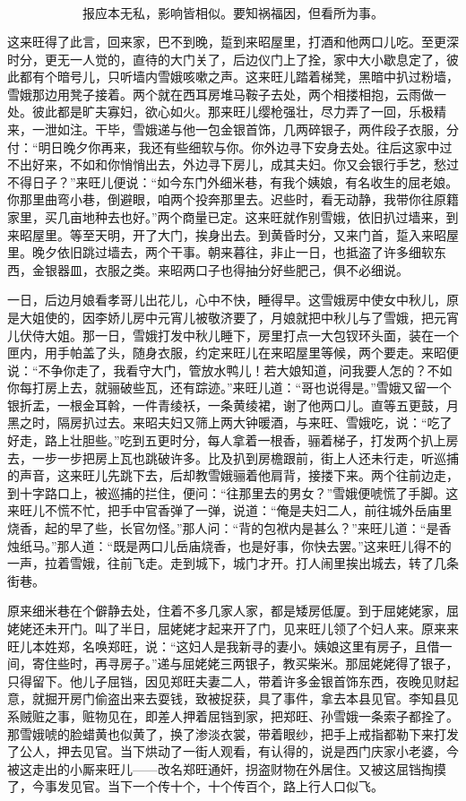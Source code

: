 \[
报应本无私，影响皆相似。
要知祸福因，但看所为事。
\]

这来旺得了此言，回来家，巴不到晚，踅到来昭屋里，打酒和他两口儿吃。至更深时分，更无一人觉的，直待的大门关了，后边仪门上了拴，家中大小歇息定了，彼此都有个暗号儿，只听墙内雪娥咳嗽之声。这来旺儿踏着梯凳，黑暗中扒过粉墙，雪娥那边用凳子接着。两个就在西耳房堆马鞍子去处，两个相搂相抱，云雨做一处。彼此都是旷夫寡妇，欲心如火。那来旺儿缨枪强壮，尽力弄了一回，乐极精来，一泄如注。干毕，雪娥递与他一包金银首饰，几两碎银子，两件段子衣服，分付：“明日晚夕你再来，我还有些细软与你。你外边寻下安身去处。往后这家中过不出好来，不如和你悄悄出去，外边寻下房儿，成其夫妇。你又会银行手艺，愁过不得日子？”来旺儿便说：“如今东门外细米巷，有我个姨娘，有名收生的屈老娘。你那里曲弯小巷，倒避眼，咱两个投奔那里去。迟些时，看无动静，我带你往原籍家里，买几亩地种去也好。”两个商量已定。这来旺就作别雪娥，依旧扒过墙来，到来昭屋里。等至天明，开了大门，挨身出去。到黄昏时分，又来门首，踅入来昭屋里。晚夕依旧跳过墙去，两个干事。朝来暮往，非止一日，也抵盗了许多细软东西，金银器皿，衣服之类。来昭两口子也得抽分好些肥己，俱不必细说。

一日，后边月娘看孝哥儿出花儿，心中不快，睡得早。这雪娥房中使女中秋儿，原是大姐使的，因李娇儿房中元宵儿被敬济要了，月娘就把中秋儿与了雪娥，把元宵儿伏侍大姐。那一日，雪娥打发中秋儿睡下，房里打点一大包钗环头面，装在一个匣内，用手帕盖了头，随身衣服，约定来旺儿在来昭屋里等候，两个要走。来昭便说：“不争你走了，我看守大门，管放水鸭儿！若大娘知道，问我要人怎的？不如你每打房上去，就骊破些瓦，还有踪迹。”来旺儿道：“哥也说得是。”雪娥又留一个银折盂，一根金耳斡，一件青绫袄，一条黄绫裙，谢了他两口儿。直等五更鼓，月黑之时，隔房扒过去。来昭夫妇又筛上两大钟暖酒，与来旺、雪娥吃，说：“吃了好走，路上壮胆些。”吃到五更时分，每人拿着一根香，骊着梯子，打发两个扒上房去，一步一步把房上瓦也跳破许多。比及扒到房檐跟前，街上人还未行走，听巡捕的声音，这来旺儿先跳下去，后却教雪娥骊着他肩背，接搂下来。两个往前边走，到十字路口上，被巡捕的拦住，便问：“往那里去的男女？”雪娥便唬慌了手脚。这来旺儿不慌不忙，把手中官香弹了一弹，说道：“俺是夫妇二人，前往城外岳庙里烧香，起的早了些，长官勿怪。”那人问：“背的包袱内是甚么？”来旺儿道：“是香烛纸马。”那人道：“既是两口儿岳庙烧香，也是好事，你快去罢。”这来旺儿得不的一声，拉着雪娥，往前飞走。走到城下，城门才开。打人闹里挨出城去，转了几条街巷。

原来细米巷在个僻静去处，住着不多几家人家，都是矮房低厦。到于屈姥姥家，屈姥姥还未开门。叫了半日，屈姥姥才起来开了门，见来旺儿领了个妇人来。原来来旺儿本姓郑，名唤郑旺，说：“这妇人是我新寻的妻小。姨娘这里有房子，且借一间，寄住些时，再寻房子。”递与屈姥姥三两银子，教买柴米。那屈姥姥得了银子，只得留下。他儿子屈铛，因见郑旺夫妻二人，带着许多金银首饰东西，夜晚见财起意，就掘开房门偷盗出来去耍钱，致被捉获，具了事件，拿去本县见官。李知县见系贼赃之事，赃物见在，即差人押着屈铛到家，把郑旺、孙雪娥一条索子都拴了。那雪娥唬的脸蜡黄也似黄了，换了渗淡衣裳，带着眼纱，把手上戒指都勒下来打发了公人，押去见官。当下烘动了一街人观看，有认得的，说是西门庆家小老婆，今被这走出的小厮来旺儿——改名郑旺通奸，拐盗财物在外居住。又被这屈铛掏摸了，今事发见官。当下一个传十个，十个传百个，路上行人口似飞。


